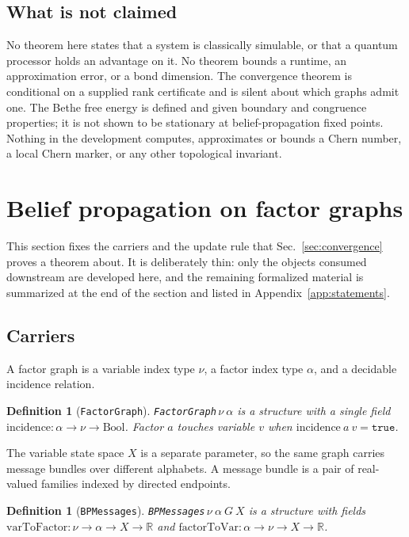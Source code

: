 \documentclass[aps,prx,reprint,nofootinbib,floatfix]{revtex4-2}
\newtheorem{defn}[thm]{Definition}
\begin{document}
\subsection{What is not claimed}

No theorem here states that a system is classically simulable, or that a
quantum processor holds an advantage on it. No theorem bounds a runtime, an
approximation error, or a bond dimension. The convergence theorem is
conditional on a supplied rank certificate and is silent about which graphs
admit one. The Bethe free energy is defined and given boundary and congruence
properties; it is not shown to be stationary at belief-propagation fixed
points. Nothing in the development computes, approximates or bounds a Chern
number, a local Chern marker, or any other topological invariant.

\section{Belief propagation on factor graphs}
\label{sec:bp}

This section fixes the carriers and the update rule that
Sec.~\ref{sec:convergence} proves a theorem about. It is deliberately thin:
only the objects consumed downstream are developed here, and the remaining
formalized material is summarized at the end of the section and listed in
Appendix~\ref{app:statements}.

\subsection{Carriers}

A factor graph is a variable index type $\nu$, a factor index type $\alpha$,
and a decidable incidence relation.

\begin{defn}[\texttt{FactorGraph}]
\texttt{FactorGraph}\,$\nu\ \alpha$ is a structure with a single field
$\mathrm{incidence} : \alpha \to \nu \to \mathrm{Bool}$. Factor $a$ touches
variable $v$ when $\mathrm{incidence}\ a\ v = \mathtt{true}$.
\end{defn}

The variable state space $X$ is a separate parameter, so the same graph carries
message bundles over different alphabets. A message bundle is a pair of
real-valued families indexed by directed endpoints.

\begin{defn}[\texttt{BPMessages}]
\texttt{BPMessages}\,$\nu\ \alpha\ G\ X$ is a structure with fields
$\mathrm{varToFactor} : \nu \to \alpha \to X \to \mathbb{R}$ and
$\mathrm{factorToVar} : \alpha \to \nu \to X \to \mathbb{R}$.
\end{defn}
\end{document}
